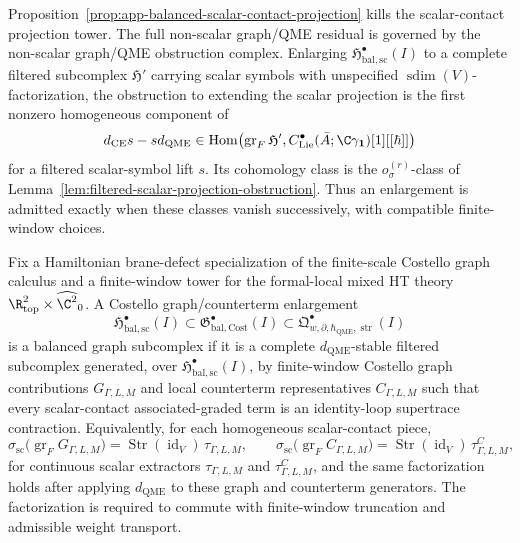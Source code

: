 \begin{rmk}
\label{rmk:app-balanced-projection-extension-obstruction}
  Proposition~\ref{prop:app-balanced-scalar-contact-projection} kills
  the scalar-contact projection tower.  The full non-scalar graph/QME
  residual is governed by the non-scalar graph/QME obstruction complex.  Enlarging
  \(\mathfrak H^\bullet_{\mathrm{bal,sc}}(I)\) to a complete filtered
  subcomplex \(\mathfrak H'\) carrying scalar symbols with unspecified
  \(\operatorname{sdim}(V)\)-factorization, the obstruction to
  extending the scalar projection is the first nonzero homogeneous
  component of
  \[
    d_{\mathrm{CE}}s-sd_{\mathrm{QME}}
      \in
    \operatorname{Hom}\!\left(
      \operatorname{gr}_{F}\mathfrak H',
      C^\bullet_{\mathrm{Lie}}(\bar A;\C\gamma_{\mathbf 1})[1][[\hbar]]
    \right)
  \]
  for a filtered scalar-symbol lift \(s\).  Its cohomology class is the
  \(o_\sigma^{(r)}\)-class of
  Lemma~\ref{lem:filtered-scalar-projection-obstruction}.  Thus an
  enlargement is admitted exactly when these classes vanish successively,
  with compatible finite-window choices.
\end{rmk}

\begin{defn}
\label{def:app-balanced-costello-graph-subcomplex}
  Fix a Hamiltonian brane-defect specialization of the finite-scale
  Costello graph calculus and a finite-window tower for the formal-local
  mixed HT theory
  \(\R^2_{\mathrm{top}}\times\widehat{\C^2}_0\).  A Costello
  graph/counterterm enlargement
  \[
    \mathfrak H^\bullet_{\mathrm{bal,sc}}(I)
      \subset
    \mathfrak G^\bullet_{\mathrm{bal,Cost}}(I)
      \subset
    \mathfrak Q^\bullet_{w,\partial,\hbar_{\mathrm{QME}},\operatorname{str}}(I)
  \]
  is a balanced graph subcomplex if it is a complete
  \(d_{\mathrm{QME}}\)-stable filtered subcomplex generated, over
  \(\mathfrak H^\bullet_{\mathrm{bal,sc}}(I)\), by finite-window
  Costello graph contributions \(G_{\Gamma,L,M}\) and local counterterm
  representatives \(C_{\Gamma,L,M}\) such that every scalar-contact
  associated-graded term is an identity-loop supertrace contraction.
  Equivalently, for each homogeneous scalar-contact piece,
  \[
    \sigma_{\mathrm{sc}}\bigl(\operatorname{gr}_{F}G_{\Gamma,L,M}\bigr)
      =
    \operatorname{Str}(\operatorname{id}_V)\,\tau_{\Gamma,L,M},
    \qquad
    \sigma_{\mathrm{sc}}\bigl(\operatorname{gr}_{F}C_{\Gamma,L,M}\bigr)
      =
    \operatorname{Str}(\operatorname{id}_V)\,\tau^C_{\Gamma,L,M},
  \]
  for continuous scalar extractors \(\tau_{\Gamma,L,M}\) and
  \(\tau^C_{\Gamma,L,M}\), and the same factorization holds after
  applying \(d_{\mathrm{QME}}\) to these graph and counterterm
  generators.  The factorization is required to commute with
  finite-window truncation and admissible weight transport.
\end{defn}

